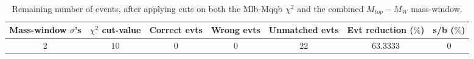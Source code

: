 \documentclass{article}
\begin{document}
 \begin{table}[h!t] 
  \caption{Remaining number of events, after applying cuts on both the Mlb-Mqqb $\chi^{2}$ and the combined $M_{top}-M_{W}$ mass-window.} 
  \centering 

   \begin{tabular}{c|c|c|c|c|c|c}
    Mass-window $\sigma$'s & $\chi^{2}$ cut-value   & Correct evts   & Wrong evts    & Unmatched evts & Evt reduction ($\%$)   & s/b ($\%$)    \\
     \hline
     2 & 10 & 0 & 0 & 22 & 63.3333 & 0
   \end{tabular} 
 \end{table} 
 
\end{document}
